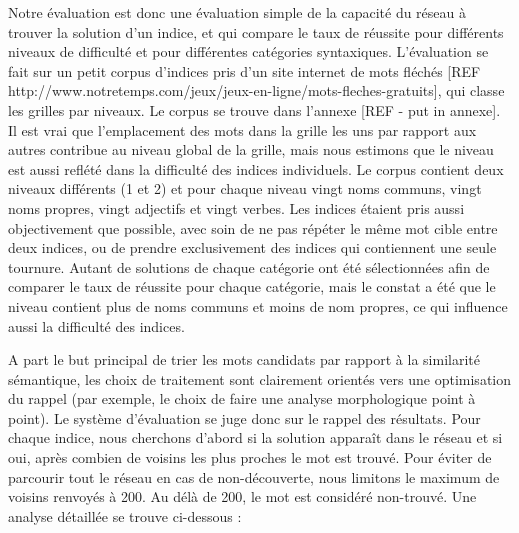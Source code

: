 Notre évaluation est donc une évaluation simple de la capacité du réseau à trouver la solution d'un indice, et qui compare le taux de réussite pour différents niveaux de difficulté et pour différentes catégories syntaxiques. L'évaluation se fait sur un petit corpus d'indices pris d'un site internet de mots fléchés [REF http://www.notretemps.com/jeux/jeux-en-ligne/mots-fleches-gratuits], qui classe les grilles par niveaux. Le corpus se trouve dans l'annexe [REF - put in annexe]. Il est vrai que l'emplacement des mots dans la grille les uns par rapport aux autres contribue au niveau global de la grille, mais nous estimons que le niveau est aussi reflété dans la difficulté des indices individuels. Le corpus contient deux niveaux différents (1 et 2) et pour chaque niveau vingt noms communs, vingt noms propres, vingt adjectifs et vingt verbes. Les indices étaient pris aussi objectivement que possible, avec soin de ne pas répéter le même mot cible entre deux indices, ou de prendre exclusivement des indices qui contiennent une seule tournure. Autant de solutions de chaque catégorie ont été sélectionnées afin de comparer le taux de réussite pour chaque catégorie, mais le constat a été que le niveau contient plus de noms communs et moins de nom propres, ce qui influence aussi la difficulté des indices.

A part le but principal de trier les mots candidats par rapport à la similarité sémantique, les choix de traitement sont clairement orientés vers une optimisation du rappel (par exemple, le choix de faire une analyse morphologique point à point). Le système d'évaluation se juge donc sur le rappel des résultats. Pour chaque indice, nous cherchons d'abord si la solution apparaît dans le réseau et si oui, après combien de voisins les plus proches le mot est trouvé. Pour éviter de parcourir tout le réseau en cas de non-découverte, nous limitons le maximum de voisins renvoyés à 200. Au délà de 200, le mot est considéré non-trouvé. Une analyse détaillée se trouve ci-dessous :

